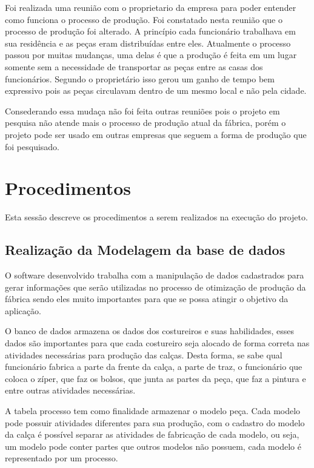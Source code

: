 \par Foi realizada uma reunião com o proprietario da empresa para poder entender
como funciona o processo de produção. Foi constatado nesta reunião que o
processo de produção foi alterado. A princípio cada funcionário trabalhava em
sua residência e as peças eram distribuídas entre eles. Atualmente o processo
passou por muitas mudanças, uma delas é que a produção é feita em um lugar
somente sem a necessidade de transportar as peças entre as casas dos
funcionários. Segundo o proprietário isso gerou um ganho de tempo bem expressivo
pois as peças circulavam dentro de um mesmo local e não pela cidade. 

\par Consederando essa mudaça não foi feita outras reuniões pois o projeto em
pesquisa não atende mais o processo de produção atual da fábrica, porém o
projeto pode ser usado em outras empresas que seguem a forma de produção que foi
pesquisado.

\section{Procedimentos}

\par Esta sessão descreve os procedimentos a serem realizados na execução do
projeto.

\subsection{Realização da Modelagem da base de dados}

\par O software desenvolvido trabalha com a manipulação de dados cadastrados
para gerar informações que serão utilizadas no processo  de otimização de
produção da fábrica sendo eles muito importantes para que se possa atingir o
objetivo da aplicação. 

\par O banco de dados armazena os dados dos costureiros e suas habilidades,
esses dados são importantes para que cada costureiro seja alocado de forma
correta nas atividades necessárias para produção das calças. Desta forma, se
sabe qual funcionário fabrica a parte da frente da calça, a parte de traz, o
funcionário que coloca o zíper, que faz os bolsos, que junta as partes da peça,
que faz a pintura e entre outras atividades necessárias.

\par A tabela processo tem como finalidade armazenar o modelo peça. Cada
modelo pode possuir atividades diferentes para sua produção, com o cadastro
do modelo da calça é possível separar as atividades de fabricação de cada
modelo, ou seja, um modelo pode conter partes que outros modelos não possuem,
cada modelo é representado por um processo.

